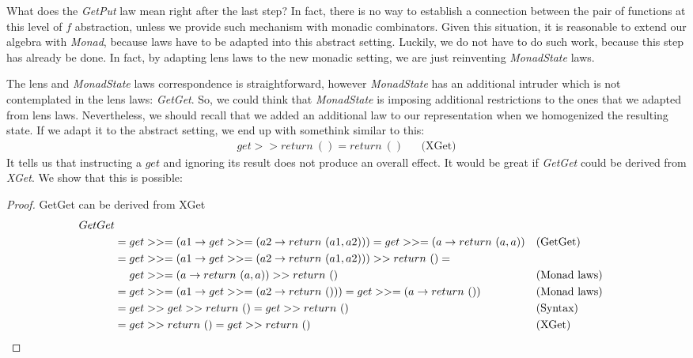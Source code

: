 \documentclass[a4paper]{article}
\begin{document}
What does the \emph{GetPut} law mean right after the last step? In fact, there
is no way to establish a connection between the pair of functions at this level
of $f$ abstraction, unless we provide such mechanism with monadic combinators.
Given this situation, it is reasonable to extend our algebra with \emph{Monad},
because laws have to be adapted into this abstract setting. Luckily, we do not
have to do such work, because this step has already be done. In fact, by
adapting lens laws to the new monadic setting, we are just reinventing
\emph{MonadState} laws.

The lens and \emph{MonadState} laws correspondence is straightforward, however
\emph{MonadState} has an additional intruder which is not contemplated in the
lens laws: \emph{GetGet}. So, we could think that \emph{MonadState} is imposing
additional restrictions to the ones that we adapted from lens laws.
Nevertheless, we should recall that we added an additional law to our
representation when we homogenized the resulting state. If we adapt it to the
abstract setting, we end up with somethink similar to this:
\begin{align*}
  get >> return\ () = return\ () &&\text{(XGet)}
\end{align*}
It tells us that instructing a $get$ and ignoring its result does not produce an
overall effect. It would be great if \emph{GetGet} could be derived from
\emph{XGet}. We show that this is possible:

\begin{proof}
  GetGet can be derived from XGet
  \begin{align*}
    GetGet \\
    &= get >>= (a1 \rightarrow get >>= (a2 \rightarrow return\ (a1, a2))) = get >>= (a \rightarrow return\ (a, a)) &&\text{(GetGet)} \\
    &= get >>= (a1 \rightarrow get >>= (a2 \rightarrow return\ (a1, a2))) >> return\ () =\\&\ \ \ \ get >>= (a \rightarrow return\ (a, a)) >> return\ () &&\text{(Monad laws)} \\
    &= get >>= (a1 \rightarrow get >>= (a2 \rightarrow return\ ())) = get >>= (a \rightarrow return\ ()) &&\text{(Monad laws)} \\
    &= get >> get >> return\ () = get >> return\ () &&\text{(Syntax)} \\
    &= get >> return\ () = get >> return\ () &&\text{(XGet)}\qedhere
  \end{align*}
\end{proof}
\end{document}

